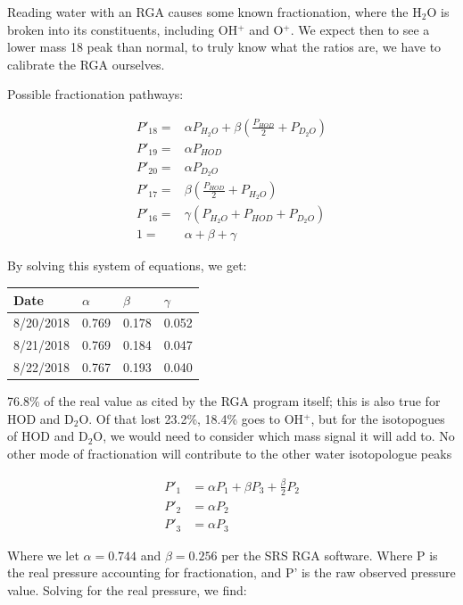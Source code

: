\documentclass[a4paper]{article}
\begin{document}
Reading water with an RGA causes some known fractionation, where the H$_2$O is broken into its constituents, including OH$^+$ and O$^+$. We expect then to see a lower mass 18 peak than normal, to truly know what the ratios are, we have to calibrate the RGA ourselves.

Possible fractionation pathways:

\begin{align}
P'_{18} = & \alpha P_{H_2O} + \beta (\frac{P_{HOD}}{2}+P_{D_2O}) \\
P'_{19} = & \alpha P_{HOD} \\
P'_{20} = & \alpha P_{D_2O} \\
P'_{17} = & \beta (\frac{P_{HOD}}{2} + P_{H_2O}) \\
P'_{16} = & \gamma (P_{H_2O} + P_{HOD} + P_{D_2O}) \\
1 = & \alpha + \beta + \gamma
\end{align}

By solving this system of equations, we get:

\begin{table}[H]
\centering
\begin{tabular}{l|l|l|l}
Date      & $\alpha$ & $\beta$  & $\gamma$ \\ \hline
8/20/2018 & 0.769 & 0.178 & 0.052 \\ \hline
8/21/2018 & 0.769 & 0.184 & 0.047 \\ \hline
8/22/2018 & 0.767 & 0.193 & 0.040
\end{tabular}
\end{table}

76.8\% of the real value as cited by the RGA program itself; this is also true for HOD and D$_2$O. Of that lost 23.2\%, 18.4\% goes to OH$^+$, but for the isotopogues of HOD and D$_2$O, we would need to consider which mass signal it will add to. No other mode of fractionation will contribute to the other water isotopologue peaks

\begin{align}
P'_1 & = \alpha P_1 + \beta P_3 + \frac{\beta}{2} P_2 \\
P'_2 & = \alpha P_2 \\
P'_3 & = \alpha P_3
\end{align}

Where we let $\alpha = 0.744$ and $\beta=0.256$ per the SRS RGA software. Where P is the real pressure accounting for fractionation, and P' is the raw observed pressure value. Solving for the real pressure, we find:
\end{document}

